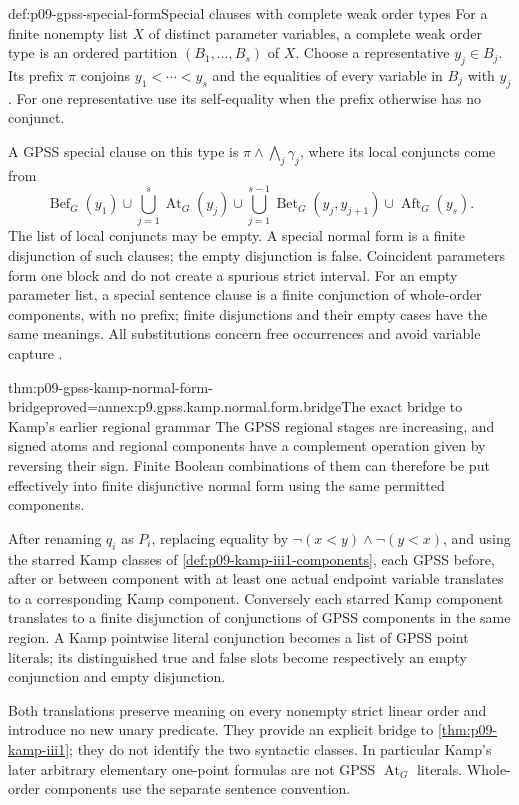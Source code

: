 \begin{hbdefinition}{def:p09-gpss-special-form}{Special clauses with complete weak order types}
For a finite nonempty list \(X\) of distinct parameter variables,
a complete weak order type is an ordered partition
\((B_1,\ldots,B_s)\) of \(X\). Choose a representative
\(y_j\in B_j\). Its prefix \(\pi\) conjoins
\(y_1<\cdots<y_s\) and the equalities of every variable
in \(B_j\) with \(y_j\). For one representative use its
self-equality when the prefix otherwise has no conjunct.

A GPSS special clause on this type is
\(\pi\land\bigwedge_j\gamma_j\), where its local conjuncts
come from
\[
 \operatorname{Bef}_G(y_1)\cup
 \bigcup_{j=1}^{s}\operatorname{At}_G(y_j)\cup
 \bigcup_{j=1}^{s-1}\operatorname{Bet}_G(y_j,y_{j+1})\cup
 \operatorname{Aft}_G(y_s).
\]
The list of local conjuncts may be empty. A special normal form is a
finite disjunction of such clauses; the empty disjunction is false.
Coincident parameters form one block and do not create a spurious
strict interval. For an empty parameter list, a special sentence
clause is a finite conjunction of whole-order components, with no
prefix; finite disjunctions and their empty cases have the same meanings.
All substitutions concern free occurrences and avoid variable capture
\cite[Lemma~1, p.~170]{GabbayPnueliShelahStavi1980}.
\end{hbdefinition}

\begin{hblemma}{thm:p09-gpss-kamp-normal-form-bridge}{proved=annex:p9.gpss.kamp.normal.form.bridge}{The exact bridge to Kamp's earlier regional grammar}
The GPSS regional stages are increasing, and signed atoms and regional
components have a complement operation given by reversing their sign.
Finite Boolean combinations of them can therefore be put effectively
into finite disjunctive normal form using the same permitted components.

After renaming \(q_i\) as \(P_i\), replacing equality by
\(\neg(x<y)\land\neg(y<x)\), and using the starred
Kamp classes of \cref{def:p09-kamp-iii1-components}, each GPSS
before, after or between component with at least one actual endpoint
variable translates to a corresponding
Kamp component. Conversely each starred Kamp component translates
to a finite disjunction of conjunctions of GPSS components in the
same region. A Kamp pointwise literal conjunction becomes a list
of GPSS point literals; its distinguished true and false slots
become respectively an empty conjunction and empty disjunction.

Both translations preserve meaning on every nonempty strict linear
order and introduce no new unary predicate. They provide an explicit
bridge to \cref{thm:p09-kamp-iii1}; they do not identify the two
syntactic classes. In particular Kamp's later arbitrary elementary
one-point formulas are not GPSS \(\operatorname{At}_G\) literals.
Whole-order components use the separate sentence convention.
\end{hblemma}

